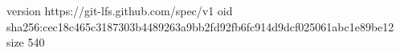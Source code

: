 version https://git-lfs.github.com/spec/v1
oid sha256:cec18c465c3187303b4489263a9bb2fd92fb6fc914d9dcf025061abc1e89be12
size 540
